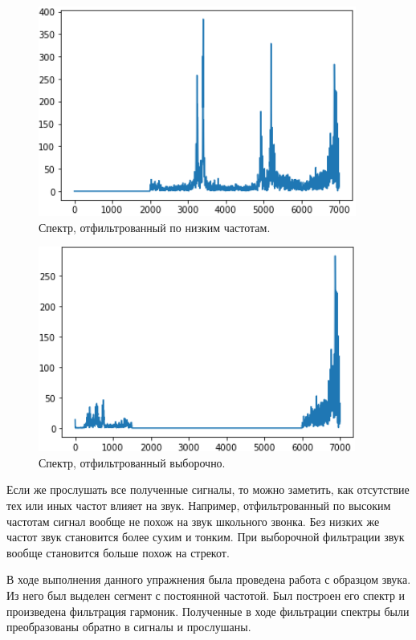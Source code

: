 \documentclass[a4paper, 14pt]{extarticle}
\begin{document}
    \begin{figure}[H]
        \centering
        \includegraphics[width=0.8\linewidth]{resources/Images/task2_filter_high_pass}
        \caption{Спектр, отфильтрованный по низким частотам.}
        \label{fig:task2_filter_high_pass}
    \end{figure}

    \begin{figure}[H]
        \centering
        \includegraphics[width=0.8\linewidth]{resources/Images/task2_filter_band_stop}
        \caption{Спектр, отфильтрованный выборочно.}
        \label{fig:task2_filter_band_stop}
    \end{figure}

    Если же прослушать все полученные сигналы, то можно заметить, как отсутствие тех или иных частот влияет на звук.
    Например, отфильтрованный по высоким частотам сигнал вообще не похож на звук школьного звонка.
    Без низких же частот звук становится более сухим и тонким. При выборочной фильтрации звук вообще становится больше похож на стрекот.

    В ходе выполнения данного упражнения была проведена работа с образцом звука.
    Из него был выделен сегмент с постоянной частотой. Был построен его спектр и произведена фильтрация гармоник.
    Полученные в ходе фильтрации спектры были преобразованы обратно в сигналы и прослушаны.
\end{document}
